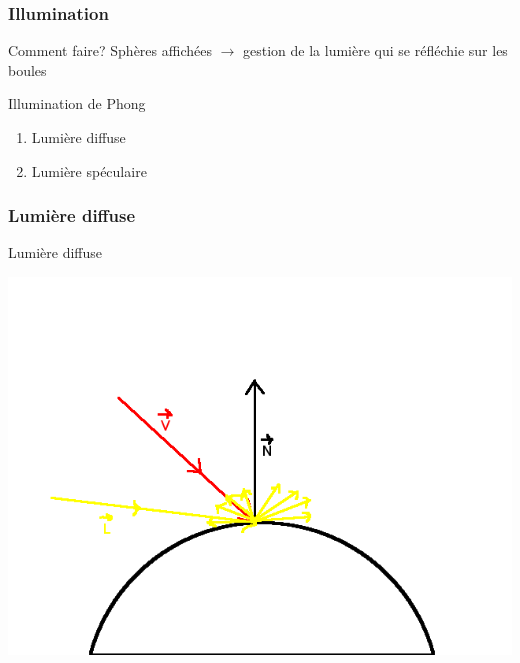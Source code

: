 \begin{frame}
	\frametitle{Illumination}
	\begin{block}{Comment faire?}
		Sphères affichées $\rightarrow$ gestion de la lumière qui se réfléchie sur les boules
	\end{block}
	\begin{block}{Illumination de Phong}
		\begin{enumerate}
			\item Lumière diffuse
			\item Lumière spéculaire
		\end{enumerate}
	\end{block}
\end{frame}
	
\begin{frame}
	\frametitle{Lumière diffuse}
	\begin{block}{Lumière diffuse}
	\begin{center}
		\includegraphics[scale=0.35]{phong1.png} 	
	\end{center}
	\end{block}
\end{frame}
	
